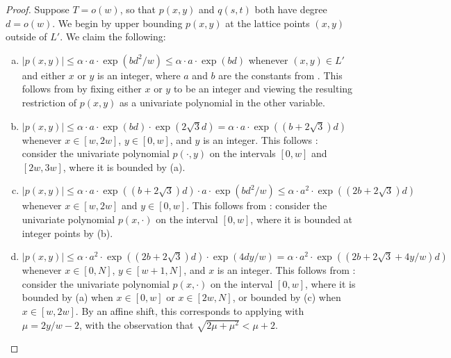 \documentclass[10pt,a4paper]{article}
\newcommand{\<}{\langle}
\renewcommand{\>}{\rangle}
\begin{document}
\begin{proof}
Suppose $T = o(w)$, so that $p(x, y)$ and $q(s, t)$ both have degree $d=o(w)$. We begin by upper bounding $p(x, y)$ at the lattice points $(x, y)$ outside of $L'$. 
We claim the following:
\begin{enumerate}[(a)]
\item $|p(x, y)| \le \alpha \cdot a \cdot \exp(bd^2 / w) \le \alpha \cdot a \cdot \exp(bd)$ whenever $(x, y) \in L'$ and either $x$ or $y$ is an integer, where $a$
and $b$ are the constants from . This follows from  by fixing either $x$ or $y$ to be an integer and viewing the resulting restriction of $p(x, y)$ as a univariate polynomial in the other variable.
\item $|p(x, y)| \le \alpha \cdot a \cdot \exp(bd) \cdot \exp(2\sqrt{3}d) = \alpha \cdot a \cdot \exp((b + 2\sqrt{3})d)$ whenever $x \in [w, 2w]$, $y \in [0, w]$, and $y$ is an integer. This follows : consider the univariate polynomial $p(\cdot, y)$ on the intervals $[0, w]$ and $[2w, 3w]$, where it is bounded by (a).
\item $|p(x, y)| \le \alpha \cdot a \cdot \exp((b + 2\sqrt{3})d) \cdot a \cdot \exp(bd^2/w) \le \alpha \cdot a^2 \cdot \exp((2b + 2\sqrt{3})d)$ whenever $x \in [w, 2w]$ and $y \in [0, w]$. This follows from : consider the univariate polynomial $p(x, \cdot)$ on the interval $[0, w]$, where it is bounded at integer points by (b).
\item $|p(x, y)| \le \alpha \cdot a^2 \cdot \exp((2b + 2\sqrt{3})d) \cdot \exp(4dy/w) = \alpha \cdot a^2 \cdot \exp((2b + 2\sqrt{3} + 4y/w)d)$ whenever $x \in [0, N]$, $y \in [w + 1, N]$, and $x$ is an integer. This follows from  : consider the univariate polynomial $p(x, \cdot)$ on the interval $[0, w]$, where it is bounded by (a) when $x \in [0, w]$ or $x \in [2w, N]$, or bounded by (c) when $x \in [w, 2w]$. 
By an affine shift, this corresponds to applying  with $\mu = 2y/w - 2$, with the observation that $\sqrt{2\mu + \mu^2} < \mu + 2$.
\end{enumerate}


\end{proof}
\end{document}
